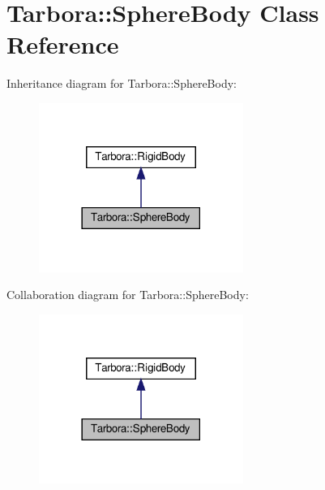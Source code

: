 \hypertarget{classTarbora_1_1SphereBody}{}\section{Tarbora\+:\+:Sphere\+Body Class Reference}
\label{classTarbora_1_1SphereBody}


Inheritance diagram for Tarbora\+:\+:Sphere\+Body\+:\nopagebreak
\begin{figure}[H]
\begin{center}
\leavevmode
\includegraphics[width=189pt]{classTarbora_1_1SphereBody__inherit__graph}
\end{center}
\end{figure}


Collaboration diagram for Tarbora\+:\+:Sphere\+Body\+:\nopagebreak
\begin{figure}[H]
\begin{center}
\leavevmode
\includegraphics[width=189pt]{classTarbora_1_1SphereBody__coll__graph}
\end{center}
\end{figure}
